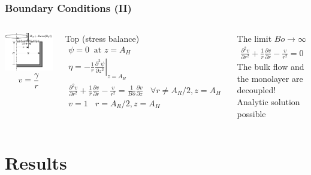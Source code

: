 \documentclass[compress]{beamer}
\begin{document}
\begin{frame} \frametitle{Boundary Conditions (II)}
\begin{columns}
\includegraphics[scale=0.8]{scheme.pdf}
$$v = \frac{\gamma}{r}$$
{\small
\begin{block}{Top (stress balance)}
\vspace{-5mm}
\begin{align*}
\psi=0~\text{ at } z=A_H\\
\eta=\left.-\frac{1}{r}\frac{\partial^2\psi}{\partial z^2}\right|_{z=A_H}\\
\frac{\partial^2 v}{\partial r^2}+\frac{1}{r}\frac{\partial v}{\partial r}-\frac{v}{r^2} = \frac{1}{Bo}\frac{\partial v}{\partial z}~~~~ \forall r\neq A_R/2, z=A_H\\
v=1 ~~~~ r= A_R/2, z=A_H
\end{align*}
\end{block}}
\pause
{\small
\begin{block}{The limit $Bo\rightarrow\infty$}
\vspace{-5mm}
\begin{align*}
\frac{\partial^2 v}{\partial r^2}+\frac{1}{r}\frac{\partial v}{\partial r}-\frac{v}{r^2} = 0
\end{align*}
\pause
The bulk flow and the monolayer are decoupled!
Analytic solution possible
\end{block}}
\end{columns}
\end{frame}

\section[Results]{Results}
\end{document}
